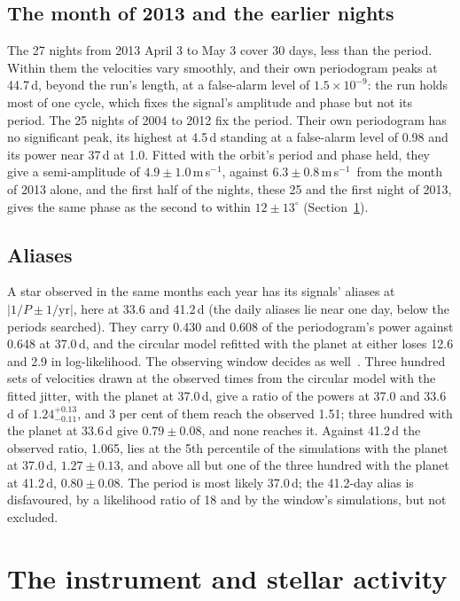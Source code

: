 \documentclass[3p,11pt]{elsarticle}
\newcommand{\ms}{m\,s$^{-1}$}
\begin{document}
\subsection{The month of 2013 and the earlier nights}\label{sec:month}

The 27 nights from 2013 April 3 to May 3 cover 30 days, less than the period. Within them the
velocities vary smoothly, and their own periodogram peaks at 44.7\,d, beyond the run's length, at a
false-alarm level of $1.5\times10^{-9}$: the run holds most of one cycle, which fixes the signal's
amplitude and phase but not its period. The 25 nights of 2004 to 2012 fix the period. Their own
periodogram has no significant peak, its highest at 4.5\,d standing at a false-alarm level of 0.98 and
its power near 37\,d at 1.0. Fitted with the orbit's period and phase held, they give a semi-amplitude
of $4.9 \pm 1.0$\,\ms, against $6.3 \pm 0.8$\,\ms\ from the month of 2013 alone, and the first half of
the nights, these 25 and the first night of 2013, gives the same phase as the second to within
$12 \pm 13^\circ$ (Section~\ref{sec:tests}).

\subsection{Aliases}

A star observed in the same months each year has its signals' aliases at $|1/P \pm 1/\mathrm{yr}|$,
here at 33.6 and 41.2\,d (the daily aliases lie near one day, below the periods searched). They carry
0.430 and 0.608 of the periodogram's power against 0.648 at 37.0\,d, and the circular model refitted
with the planet at either loses 12.6 and 2.9 in log-likelihood. The observing window decides as
well~\cite{Dawson2010}. Three hundred sets of velocities drawn at the observed times from the circular
model with the fitted jitter, with the planet at 37.0\,d, give a ratio of the powers at 37.0 and
33.6\,d of $1.24^{+0.13}_{-0.11}$, and 3 per cent of them reach the observed 1.51; three hundred with
the planet at 33.6\,d give $0.79 \pm 0.08$, and none reaches it. Against 41.2\,d the observed ratio,
1.065, lies at the 5th percentile of the simulations with the planet at 37.0\,d, $1.27 \pm 0.13$, and
above all but one of the three hundred with the planet at 41.2\,d, $0.80 \pm 0.08$. The period is most
likely 37.0\,d; the 41.2-day alias is disfavoured, by a likelihood ratio of 18 and by the window's
simulations, but not excluded.

\section{The instrument and stellar activity}\label{sec:tests}
\end{document}
